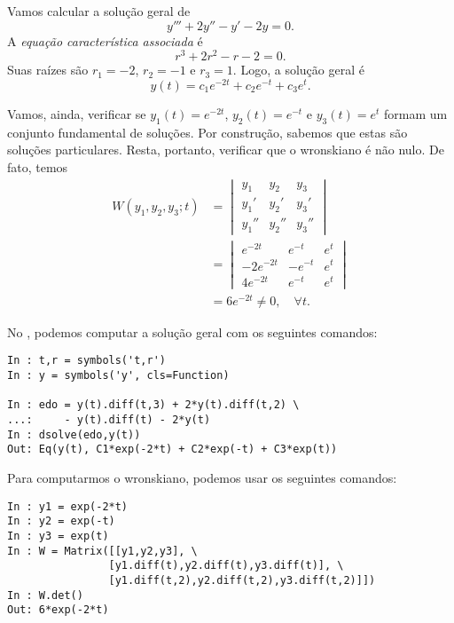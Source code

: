 \begin{ex}\label{ex:edolin_on_h}
  Vamos calcular a solução geral de
  \begin{equation}
    y''' + 2y'' - y' - 2y = 0.
  \end{equation}
  A \emph{equação característica associada} é
  \begin{equation}
    r^3 + 2r^2 - r - 2 = 0.
  \end{equation}
  Suas raízes são $r_1 = -2$, $r_2 = -1$ e $r_3=1$. Logo, a solução geral é
  \begin{equation}
    y(t) = c_1e^{-2t} + c_2e^{-t} + c_3e^t.
  \end{equation}

  Vamos, ainda, verificar se $y_1(t) = e^{-2t}$, $y_2(t) = e^{-t}$ e $y_3(t) = e^t$ formam um conjunto fundamental de soluções. Por construção, sabemos que estas são soluções particulares. Resta, portanto, verificar que o wronskiano é não nulo. De fato, temos
  \begin{align}
    W(y_1, y_2, y_3; t) &=
                          \begin{vmatrix}
                            y_1 & y_2 & y_3 \\
                            y_1' & y_2' & y_3' \\
                            y_1'' & y_2'' & y_3''
                          \end{vmatrix} \\
                        &=
                          \begin{vmatrix}
                            e^{-2t} & e^{-t} & e^t \\
                            -2e^{-2t} & -e^{-t} & e^t \\
                            4e^{-2t} & e^{-t} & e^t
                          \end{vmatrix} \\
                        &= 6e^{-2t} \neq 0,\quad \forall t.
  \end{align}

  \ifispython
  No \python, podemos computar a solução geral com os seguintes comandos:
\begin{verbatim}
In : t,r = symbols('t,r')
In : y = symbols('y', cls=Function)

In : edo = y(t).diff(t,3) + 2*y(t).diff(t,2) \
...:     - y(t).diff(t) - 2*y(t)  
In : dsolve(edo,y(t))
Out: Eq(y(t), C1*exp(-2*t) + C2*exp(-t) + C3*exp(t))
\end{verbatim}
  Para computarmos o wronskiano, podemos usar os seguintes comandos:
\begin{verbatim}
In : y1 = exp(-2*t)
In : y2 = exp(-t)
In : y3 = exp(t)
In : W = Matrix([[y1,y2,y3], \
                [y1.diff(t),y2.diff(t),y3.diff(t)], \
                [y1.diff(t,2),y2.diff(t,2),y3.diff(t,2)]])
In : W.det()
Out: 6*exp(-2*t)
\end{verbatim}
  \fi
\end{ex}

